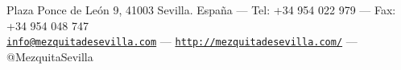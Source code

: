 \documentclass[12pt]{article}
\begin{document}
 \begin{center}
   \footnotesize
   Plaza Ponce de León 9, 41003 Sevilla. España ---
   Tel: +34 954 022 979 --- Fax: +34 954 048 747\\
   \href{mailto:info@mezquitadesevilla.com}{\texttt{info{@}mezquitadesevilla.com}}
   ---
   \href{https://is.gd/l3kw7n}{\texttt{http://mezquitadesevilla.com/}}
   --- {@}MezquitaSevilla
   \href{https://www.facebook.com/MezquitaSevilla/}{\faFacebookSquare}\
   \href{https://www.instagram.com/mezquitasevilla/}{\faInstagram}\
   \href{https://twitter.com/MezquitaSevilla}{\faTwitterSquare}
 \end{center}
 
\end{document}
